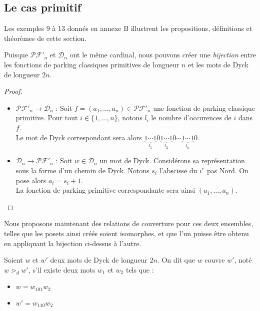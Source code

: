 \subsection{Le cas primitif}

Les exemples 9 à 13 donnés en annexe B illustrent les propositions,
définitions et théorèmes de cette section.

\begin{prop}
    Puisque $\mathcal{PF'}_n$ et $\mathcal{D}_n$ ont le même cardinal,
    nous pouvons créer une \emph{bijection} entre les fonctions de parking
    classiques primitives de longueur $n$ et les mots de Dyck de
    longueur $2n$.
\end{prop}

\begin{proof}
    ~\
\begin{itemize}
    \item $\mathcal{PF'}_n \to \mathcal{D}_n$ :
    Soit $f = (a_1, \ldots, a_n) \in \mathcal{PF'}_n$
    une fonction de parking classique primitive.
    Pour tout $i \in \{1, \ldots, n\}$, notons $l_i$ le nombre
    d'occurences de $i$ dans $f$.\\
    Le mot de Dyck correspondant sera alors
    $\underbrace{1 \cdots 1}_{l_1}0
     \underbrace{1 \cdots 1}_{l_2}0 \cdots
     \underbrace{1 \cdots 1}_{l_n}0$.
    
    \item $\mathcal{D}_n \to \mathcal{PF'}_n$ :
    Soit $w \in \mathcal{D}_n$ un mot de Dyck. Considérons sa
    représentation sous la forme d'un chemin de Dyck.
    Notons $s_i$ l'abscisse du $i^{e}$ pas Nord.
    On pose alors $a_i = s_i + 1$.\\
    La fonction de parking primitive correspondante sera ainsi
    $(a_1, \ldots, a_n)$.
\end{itemize}
\end{proof}

Nous proposons maintenant des relations de couverture pour ces deux
ensembles, telles que les posets ainsi créés soient isomorphes, et que 
l'un puisse être obtenu en appliquant la bijection ci-dessus à l'autre.

\begin{definition}[$\gtrdot_d$]
    Soient $w$ et $w'$ deux mots de Dyck de longueur $2n$.
    On dit que $w$ couvre $w'$, noté $w \gtrdot_d w'$, s'il existe deux
    mots $w_1$ et $w_2$ tels que :
    \begin{itemize}
        \item $w = w_101w_2$
        \item $w' = w_110w_2$
    \end{itemize}  
\end{definition}

